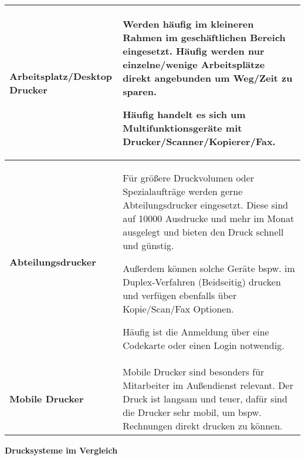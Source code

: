 \documentclass[asp1.tex]{subfiles}
\begin{document}
\begin{longtable}{|p{}|p{}|}
    \hline

    \textbf{Arbeitsplatz/Desktop Drucker} &
    Werden häufig im kleineren Rahmen im geschäftlichen Bereich eingesetzt. Häufig werden nur einzelne/wenige Arbeitsplätze direkt angebunden um Weg/Zeit zu sparen.

    Häufig handelt es sich um Multifunktionsgeräte mit Drucker/Scanner/Kopierer/Fax.
    \\\hline

    \textbf{Abteilungsdrucker}            &
    Für größere Druckvolumen oder Spezialaufträge werden gerne Abteilungsdrucker eingesetzt. Diese sind auf 10000 Ausdrucke und mehr im Monat ausgelegt und bieten den Druck schnell und günstig.

    Außerdem können solche Geräte bspw. im Duplex-Verfahren (Beidseitig) drucken und verfügen ebenfalls über Kopie/Scan/Fax Optionen.

    Häufig ist die Anmeldung über eine Codekarte oder einen Login notwendig.
    \\\hline

    \textbf{Mobile Drucker}               &
    Mobile Drucker sind besonders für Mitarbeiter im Außendienst relevant. Der Druck ist langsam und teuer, dafür sind die Drucker sehr mobil, um bspw. Rechnungen direkt drucken zu können.


    \\\hline
\end{longtable}
\break
\textbf{Drucksysteme im Vergleich}
\end{document}
